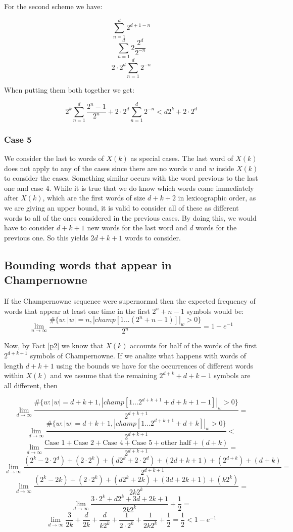 \documentclass[11pt,a4paper]{tesis}
\theoremstyle{definition}
\begin{document}
For the second scheme we have:

$$ \sum_{n=1}^{d} 2^{d + 1 - n}$$
$$ \sum_{n=1}^{d} 2 \frac{2^d}{2^{- n}}$$
$$ 2 \cdot 2^d \sum_{n=1}^{d} 2^{- n}$$

When putting them both together we get:

$$  2^k \sum_{n=1}^{d} \frac{2^n - 1}{2^n}  + 2 \cdot 2^d \sum_{n=1}^{d} 2^{- n} < d2^k + 2 \cdot 2^d$$

\subsubsection{Case 5}

We consider the last to words of $X(k)$ as special cases. The last word of $X(k)$ does not apply to any of the cases since there are no words $v$ and $w$ inside $X(k)$ to consider the cases. Something similar occurs with the word previous to the last one and case 4. 
While it is true that we do know which words come immediately after  $X(k)$, which are the first words of size $d+k+2$ in lexicographic order, as we are giving an upper bound, it is valid to consider all of these as different words to all of the ones considered in the previous cases.
By doing this, we would have to consider $d+k+1$ new words for the last word and $d$ words for the previous one. So this yields $2d+k+1$ words to consider.


\subsection{Bounding words that appear in Champernowne}

If the Champernowne sequence were supernormal then the expected frequency of words that appear at least one time in the first $2^n + n -1$ symbols would be:
$$\lim_{n\to\infty} \frac{\#\{w: |w| = n  , |champ[1...(2^n+n-1)]|_w > 0\}}{2^n}  = 1 - e^{-1}$$


Now, by Fact \ref{p2} we know that $X(k)$ accounts for half of the words of the first $2^{d+k+1}$ symbols of Champernowne. 
If we analize what happens with words of length $d+k+1$ using the bounds we have for the occurrences of different words within $X(k)$ and we assume that the remaining $2^{d+k} + d + k - 1$  symbols are all different, then



$$\lim_{d\to\infty} \frac{\#\{w : |w| = d+k+1, |champ[1 \dots 2^{d+k+1}+d+k+1-1]|_w > 0 \}}{2^{d+k+1}} =$$
$$\lim_{d\to\infty} \frac{\#\{w : |w| = d+k+1, |champ[1 \dots 2^{d+k+1}+d+k]|_w > 0 \}}{2^{d+k+1}} <$$
$$\lim_{d\to\infty} \frac{ \textrm{Case 1} + \textrm{Case 2}+ \textrm{Case 4} + \textrm{Case 5} + \textrm{other half} + (d + k) }{2^{d+k+1}} =$$
$$\lim_{d\to\infty} \frac{(2^k - 2\cdot 2^d) + (2 \cdot 2^k)+ (d2^k + 2 \cdot 2^d) + (2d+k+1) + (2^{d+k}) + (d + k) }{2^{d+k+1}} =$$
$$\lim_{d\to\infty} \frac{(2^k - 2k) + (2 \cdot 2^k)+ (d2^k + 2k) + (3d+2k+1) + (k2^{k})}{2k2^{k}} =$$
$$\lim_{d\to\infty} \frac{3\cdot2^k + d2^k  + 3d+2k+1}{2k2^{k}} + \frac{1}{2} =$$
$$\lim_{d\to\infty} \frac{3}{2k} + \frac{d}{2k} + \frac{d}{k2^{k}} + \frac{1}{2\cdot2^{k}} + \frac{1}{2k2^{k}} + \frac{1}{2} = \frac{1}{2} < 1 - e^{-1}$$
\end{document}
